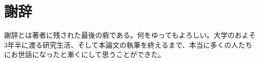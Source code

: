 \chapter*{謝辞}
謝辞とは著者に残された最後の砦である。何をゆってもよろしい。大学のおよそ3年半に渡る研究生活、そして本論文の執筆を終えるまで、本当に多くの人たちにお世話になったと漸くにして思うことができた。